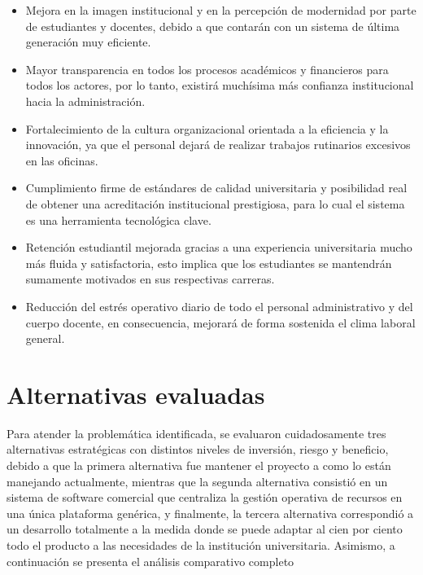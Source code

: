 \documentclass[11pt,spanish]{article}
\begin{document}
\begin{itemize}
    \item Mejora en la imagen institucional y en la percepción de modernidad por parte de estudiantes y docentes, debido a que contarán con un sistema de última generación muy eficiente.
    \item Mayor transparencia en todos los procesos académicos y financieros para todos los actores, por lo tanto, existirá muchísima más confianza institucional hacia la administración.
    \item Fortalecimiento de la cultura organizacional orientada a la eficiencia y la innovación, ya que el personal dejará de realizar trabajos rutinarios excesivos en las oficinas.
    \item Cumplimiento firme de estándares de calidad universitaria y posibilidad real de obtener una acreditación institucional prestigiosa, para lo cual el sistema es una herramienta tecnológica clave.
    \item Retención estudiantil mejorada gracias a una experiencia universitaria mucho más fluida y satisfactoria, esto implica que los estudiantes se mantendrán sumamente motivados en sus respectivas carreras.
    \item Reducción del estrés operativo diario de todo el personal administrativo y del cuerpo docente, en consecuencia, mejorará de forma sostenida el clima laboral general.
\end{itemize}

\section{Alternativas evaluadas}

Para atender la problemática identificada, se evaluaron cuidadosamente tres alternativas estratégicas con distintos niveles de inversión, riesgo y beneficio, debido a que la primera alternativa fue mantener el proyecto a como lo están manejando actualmente, mientras que la segunda alternativa consistió en un sistema de software comercial que centraliza la gestión operativa de recursos en una única plataforma genérica, y finalmente, la tercera alternativa correspondió a un desarrollo totalmente a la medida donde se puede adaptar al cien por ciento todo el producto a las necesidades de la institución universitaria. Asimismo, a continuación se presenta el análisis comparativo completo
\end{document}
